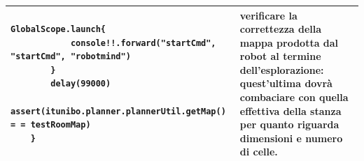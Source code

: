 \begin{center}
\begin{tabular}{|@{}p{10cm}|p{5cm}|}
\begin{lstlisting}[backgroundcolor=\color{white}]
		GlobalScope.launch{
 			console!!.forward("startCmd", "startCmd", "robotmind")
 		}
		delay(99000)
		assert(itunibo.planner.plannerUtil.getMap() = = testRoomMap)
	}
\end{lstlisting} &  \vspace{0.5ex}   verificare la correttezza della mappa prodotta dal robot al termine dell'esplorazione: quest'ultima dovrà combaciare con quella effettiva della stanza per quanto riguarda dimensioni e numero di celle. \\
\hline 

\end{tabular}
\end{center}



